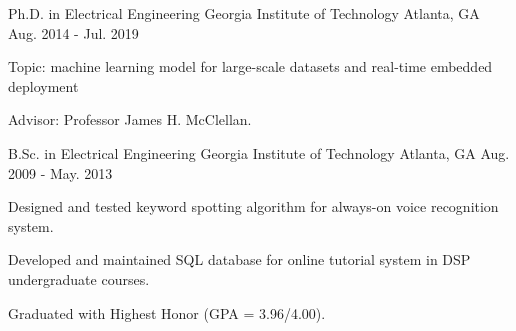 

\begin{cventries}

	\cventry
		{Ph.D. in Electrical Engineering} %
		{Georgia Institute of Technology} %
		{Atlanta, GA} %
		{Aug. 2014 - Jul. 2019} %
		{
			\begin{cvitems} %
				\item {Topic: machine learning model for large-scale datasets and real-time embedded deployment}
				\item {Advisor: Professor James H. McClellan.}
			\end{cvitems}
		}
		
	\cventry
		{B.Sc. in Electrical Engineering} %
		{Georgia Institute of Technology} %
		{Atlanta, GA} %
		{Aug. 2009 - May. 2013} %
		{
			\begin{cvitems} %
				\item {Designed and tested keyword spotting algorithm for always-on voice recognition system.}
				\item {Developed and maintained SQL database for online tutorial system in DSP undergraduate courses.}
				\item {Graduated with Highest Honor (GPA = 3.96/4.00).}
			\end{cvitems}
		}

\end{cventries}
